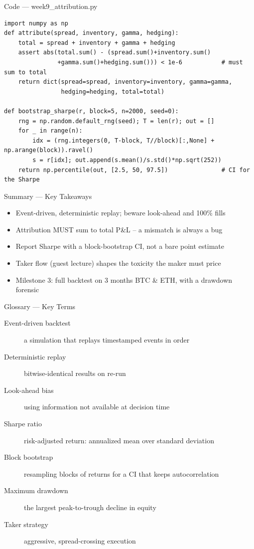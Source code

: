 \documentclass[aspectratio=169,10pt]{beamer}
\begin{document}
\begin{frame}[fragile]{Code --- week9\_attribution.py}
\begin{lstlisting}
import numpy as np
def attribute(spread, inventory, gamma, hedging):
    total = spread + inventory + gamma + hedging
    assert abs(total.sum() - (spread.sum()+inventory.sum()
               +gamma.sum()+hedging.sum())) < 1e-6           # must sum to total
    return dict(spread=spread, inventory=inventory, gamma=gamma,
                hedging=hedging, total=total)

def bootstrap_sharpe(r, block=5, n=2000, seed=0):
    rng = np.random.default_rng(seed); T = len(r); out = []
    for _ in range(n):
        idx = (rng.integers(0, T-block, T//block)[:,None] + np.arange(block)).ravel()
        s = r[idx]; out.append(s.mean()/s.std()*np.sqrt(252))
    return np.percentile(out, [2.5, 50, 97.5])               # CI for the Sharpe
\end{lstlisting}
\end{frame}
\begin{frame}{Summary --- Key Takeaways}
\begin{itemize}
  \item Event-driven, deterministic replay; beware look-ahead and 100\% fills
  \item Attribution MUST sum to total P\&L -- a mismatch is always a bug
  \item Report Sharpe with a block-bootstrap CI, not a bare point estimate
  \item Taker flow (guest lecture) shapes the toxicity the maker must price
  \item Milestone 3: full backtest on 3 months BTC \& ETH, with a drawdown forensic
\end{itemize}
\end{frame}

\begin{frame}{Glossary --- Key Terms}
\footnotesize\begin{description}
\item[\color{ncsured}Event-driven backtest] a simulation that replays timestamped events in order
\item[\color{ncsured}Deterministic replay] bitwise-identical results on re-run
\item[\color{ncsured}Look-ahead bias] using information not available at decision time
\item[\color{ncsured}Sharpe ratio] risk-adjusted return: annualized mean over standard deviation
\item[\color{ncsured}Block bootstrap] resampling blocks of returns for a CI that keeps autocorrelation
\item[\color{ncsured}Maximum drawdown] the largest peak-to-trough decline in equity
\item[\color{ncsured}Taker strategy] aggressive, spread-crossing execution
\end{description}
\end{frame}
\end{document}
